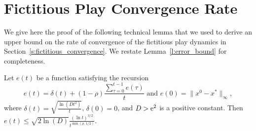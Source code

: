 \section{Fictitious Play Convergence Rate}\label{app:s:fictitious_convergence}
We give here the proof of the following technical lemma that we used to derive
an upper bound on the rate of convergence of the fictitious play dynamics in
Section~\ref{s:fictitious_convergence}.  We restate Lemma~\ref{l:error_bound} for
completeness.
\begin{lemma}
  Let $e(t)$ be a function satisfying the recursion
  \[
    e(t) =
    \delta(t) + (1-\rho)\frac{\sum_{\tau=0}^{t-1}e(\tau)}{t}
    \text{ and } e(0)=\|x^0 - x^*\|_{\infty},
  \]
  where \(\delta(t) = \sqrt{\frac{\ln(D t^2)}{t}} \), \(\delta(0) = 0 \),
  and $D > \mathrm{e}^2$ is a positive constant.  Then
  \(
    e(t) \leq
    \sqrt{2 \ln(D)} \frac{(\ln t)^{3/2}}{t^{\min(\rho,\, 1/2)}}.
  \)
\end{lemma}
